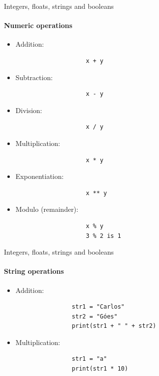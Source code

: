 \documentclass[notes,11pt, aspectratio=169, xcolor=table]{beamer}
\begin{document}
    \begin{frame}[fragile=singleslide]{Integers, floats, strings and booleans}
    \framesubtitle{Numeric operations}

        \begin{itemize}
            \item Addition:
                \begin{verbatim}
                    x + y
                \end{verbatim}    
            \item Subtraction:
                \begin{verbatim}
                    x - y
                \end{verbatim}    
            \item Division:
                \begin{verbatim}
                    x / y
                \end{verbatim}    
            \item Multiplication:
                \begin{verbatim}
                    x * y
                \end{verbatim}    
            \item Exponentiation:
                \begin{verbatim}
                    x ** y
                \end{verbatim}    
            \item Modulo (remainder):
                \begin{verbatim}
                    x % y
                    3 % 2 is 1
                \end{verbatim}    
        \end{itemize}

    \end{frame}      

    \begin{frame}[fragile=singleslide]{Integers, floats, strings and booleans}
    \framesubtitle{String operations}

        \begin{itemize}
            \item Addition:
                \begin{verbatim}
                str1 = "Carlos"
                str2 = "Góes"
                print(str1 + " " + str2)
                \end{verbatim}    
            \item Multiplication:
                \begin{verbatim}
                str1 = "a"
                print(str1 * 10)
                \end{verbatim}    
        \end{itemize}

    \end{frame}          
\end{document}
